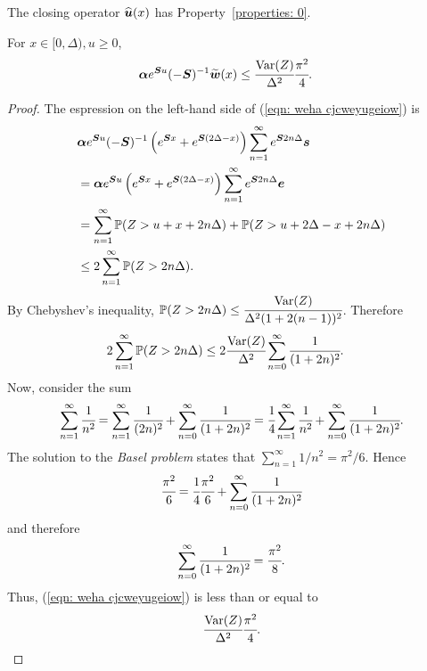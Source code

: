 \begin{lem}\label{lem: akxnj2}
	The closing operator \(\widehat{\boldsymbol u}(x)\) has Property~\ref{properties: 0}.

	For \(x\in[0,\Delta),u\geq 0\),  
        \begin{align}
        		\boldsymbol \alpha   e^{\boldsymbol Su}(-\boldsymbol S)^{-1} \widetilde{\boldsymbol w}(x) &\leq \cfrac{\mathrm{Var}(Z)}{\Delta^2}\cfrac{\pi^2}{4}.\label{eqn: weha cjcweyugeiow}
	\end{align}
\end{lem}
\begin{proof}
	The espression on the left-hand side of (\ref{eqn: weha cjcweyugeiow}) is 
	\begin{align*}
		&\boldsymbol \alpha e^{\boldsymbol Su}(-\boldsymbol S)^{-1} \left(e^{\boldsymbol{S} x} + e^{\boldsymbol{S} (2\Delta-x)}\right)\sum_{n=1}^\infty e^{\boldsymbol S  2n\Delta} \boldsymbol s
		\\&= \boldsymbol \alpha e^{\boldsymbol Su} \left(e^{\boldsymbol{S} x} + e^{\boldsymbol{S} (2\Delta-x)}\right)\sum_{n=1}^\infty e^{\boldsymbol S  2n\Delta} \boldsymbol e
		\\&=\sum_{n=1}^\infty \mathbb P(Z>u+x+2n\Delta) + \mathbb P(Z>u+2\Delta-x+2n\Delta)
		\\&\leq 2 \sum_{n=1}^\infty \mathbb P(Z>2n\Delta).
	\end{align*}
	By Chebyshev's inequality, \(\mathbb P(Z>2n\Delta)\leq \cfrac{\mathrm{Var}(Z)}{\Delta^2(1+2(n-1))^2}\). Therefore
	\begin{align}
		2 \sum_{n=1}^\infty \mathbb P(Z>2n\Delta)
		& \leq 2 \cfrac{\mathrm{Var}(Z)}{\Delta^2} \sum_{n=0}^\infty \cfrac{1}{(1+2n)^2}.
	\end{align}
	Now, consider the sum 
	\begin{align}
		\sum_{n=1}^\infty \cfrac{1}{n^2} = \sum_{n=1}^\infty \cfrac{1}{(2n)^2} + \sum_{n=0}^\infty \cfrac{1}{(1+2n)^2} = \cfrac{1}{4}\sum_{n=1}^\infty \cfrac{1}{n^2} + \sum_{n=0}^\infty \cfrac{1}{(1+2n)^2}.
	\end{align}
	The solution to the \emph{Basel problem} states that \(\displaystyle\sum_{n=1}^\infty 1/n^2=\pi^2/6.\) Hence 
	\[\cfrac{\pi^2}{6} = \cfrac{1}{4}\cfrac{\pi^2}{6} + \sum_{n=0}^\infty \cfrac{1}{(1+2n)^2}\]
	and therefore 
	\[\sum_{n=0}^\infty \cfrac{1}{(1+2n)^2} = \cfrac{\pi^2}{8}.\]
	Thus, (\ref{eqn: weha cjcweyugeiow}) is less than or equal to 
	\[\cfrac{\mathrm{Var}(Z)}{\Delta^2}\cfrac{\pi^2}{4}.\]
\end{proof}


